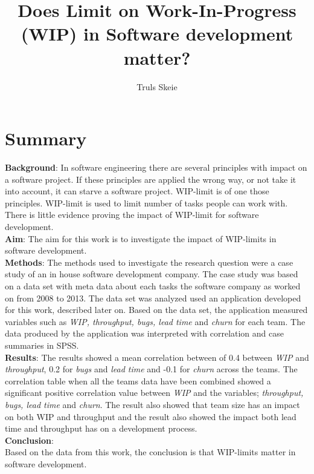 \documentclass[UKenglish]{ifimaster}  %
\title{Does Limit on Work-In-Progress (WIP) in Software development matter?}        %
\author{Truls Skeie}                      %
\begin{document}
\ififorside{}
\frontmatter{}
\maketitle{}

\chapter*{Summary}                   %
\textbf{Background}: 
In software engineering there are several principles with impact on a software project. If these principles are applied the wrong way, or not take it into account, it can starve a software project. WIP-limit is of one those principles.  WIP-limit is used to limit number of tasks people can work with. There is little evidence proving the impact of WIP-limit for software development.\\
\textbf{Aim}: 
The aim for this work is to investigate the impact of WIP-limits in software development. \\
\textbf{Methods}:
The methods used to investigate the research question were a case study of an in house software development company. The case study was based on a data set with meta data about each tasks the software company as worked on from 2008 to 2013. The data set was analyzed used an application developed for this work, described later on. Based on the data set, the application measured variables such as \textit{WIP, throughput, bugs, lead time} and \textit{churn} for each team. The data produced by the application was interpreted with correlation and case summaries in SPSS.\\
\textbf{Results}: The results showed a mean correlation between of 0.4 between \textit{WIP} and \textit{throughput}, 0.2 for \textit{bugs} and \textit{lead time} and -0.1 for \textit{churn} across the teams.  The correlation table when all the teams data have been combined showed a significant positive correlation value between \textit{WIP} and the variables; \textit{throughput, bugs, lead time} and \textit{churn}.  The result also showed that team size has an impact on both WIP and throughput and the result also showed the impact both lead time and throughput has on a development process.\\ 
\textbf{Conclusion}:\\
Based on the data from this work, the conclusion is that WIP-limits matter in software development. 

\tableofcontents{}
\listoffigures{}
\listoftables{}
\lstlistoflistings{}
\end{document}
